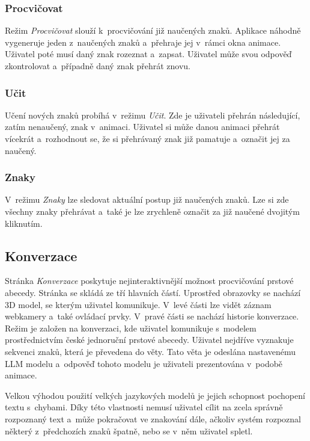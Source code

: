 \documentclass[
  master,
  program=ainfvs,
  biblatex,
  figures=true,
  tables=false,
  sourcecodes=true,
  glossaries,
  index
]{kidiplom}
\begin{document}
        \subsubsection{Procvičovat}
            Režim \emph{Procvičovat} slouží k~procvičování již naučených znaků. Aplikace náhodně vygeneruje jeden z~naučených znaků a~přehraje jej v~rámci okna animace. Uživatel poté musí daný znak rozeznat a~zapsat. Uživatel může svou odpověď zkontrolovat a~případně daný znak přehrát znovu.

        \subsubsection{Učit}
            Učení nových znaků probíhá v~režimu \emph{Učit}. Zde je uživateli přehrán následující, zatím nenaučený, znak v~animaci. Uživatel si může danou animaci přehrát vícekrát a~rozhodnout se, že si přehrávaný znak již pamatuje a~označit jej za naučený.

        \subsubsection{Znaky}
            V~režimu \emph{Znaky} lze sledovat aktuální postup již naučených znaků. Lze si zde všechny znaky přehrávat a~také je lze zrychleně označit za již naučené dvojitým kliknutím.

    \subsection{Konverzace} \label{up-konverzace}
        Stránka \emph{Konverzace} poskytuje nejinteraktivnější možnost procvičování prstové abecedy. Stránka se skládá ze tří hlavních částí. Uprostřed obrazovky se nachází 3D model, se kterým uživatel komunikuje. V~levé části lze vidět záznam webkamery a~také ovládací prvky. V~pravé části se nachází historie konverzace. Režim je založen na konverzaci, kde uživatel komunikuje s~modelem prostřednictvím české jednoruční prstové abecedy. Uživatel nejdříve vyznakuje sekvenci znaků, která je převedena do věty. Tato věta je odeslána nastavenému LLM modelu a~odpověď tohoto modelu je uživateli prezentována v~podobě animace.


        Velkou výhodou použití velkých jazykových modelů je jejich schopnost pochopení textu s~chybami. Díky této vlastnosti nemusí uživatel cílit na zcela správně rozpoznaný text a~může pokračovat ve znakování dále, ačkoliv systém rozpoznal některý z~předchozích znaků špatně, nebo se v~něm uživatel spletl.
\end{document}
